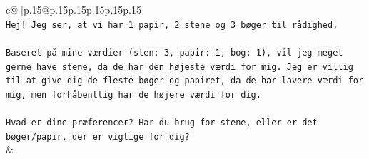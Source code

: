 \documentclass{article}
\begin{document}
{\begin{supertabular}{c@{$\;$}|p{.15\linewidth}@{}p{.15\linewidth}p{.15\linewidth}p{.15\linewidth}p{.15\linewidth}p{.15\linewidth}}
{{{\\ 
\texttt{Hej! Jeg ser, at vi har 1 papir, 2 stene og 3 bøger til rådighed.} \\
\\ 
\texttt{Baseret på mine værdier (sten: 3, papir: 1, bog: 1), vil jeg meget gerne have stene, da de har den højeste værdi for mig. Jeg er villig til at give dig de fleste bøger og papiret, da de har lavere værdi for mig, men forhåbentlig har de højere værdi for dig.} \\
\\ 
\texttt{Hvad er dine præferencer? Har du brug for stene, eller er det bøger/papir, der er vigtige for dig?} \\
            }
        }
    }
    & \\ \\


\end{supertabular}}
\end{document}
